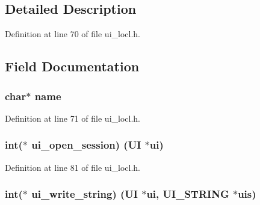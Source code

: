 \subsection{Detailed Description}


Definition at line 70 of file ui\+\_\+locl.\+h.



\subsection{Field Documentation}
\subsubsection[{\texorpdfstring{name}{name}}]{\setlength{\rightskip}{0pt plus 5cm}char$\ast$ name}\hypertarget{structui__method__st_a5ac083a645d964373f022d03df4849c8}{}\label{structui__method__st_a5ac083a645d964373f022d03df4849c8}


Definition at line 71 of file ui\+\_\+locl.\+h.

\subsubsection[{\texorpdfstring{ui\+\_\+open\+\_\+session}{ui_open_session}}]{\setlength{\rightskip}{0pt plus 5cm}int($\ast$ ui\+\_\+open\+\_\+session) ({\bf UI} $\ast$ui)}\hypertarget{structui__method__st_a4ac58de890816b0a78fc4ef9f89c13bb}{}\label{structui__method__st_a4ac58de890816b0a78fc4ef9f89c13bb}


Definition at line 81 of file ui\+\_\+locl.\+h.

\subsubsection[{\texorpdfstring{ui\+\_\+write\+\_\+string}{ui_write_string}}]{\setlength{\rightskip}{0pt plus 5cm}int($\ast$ ui\+\_\+write\+\_\+string) ({\bf UI} $\ast$ui, {\bf U\+I\+\_\+\+S\+T\+R\+I\+NG} $\ast$uis)}\hypertarget{structui__method__st_a5c215bfe8b7cff90102987a354eeeadd}{}\label{structui__method__st_a5c215bfe8b7cff90102987a354eeeadd}


